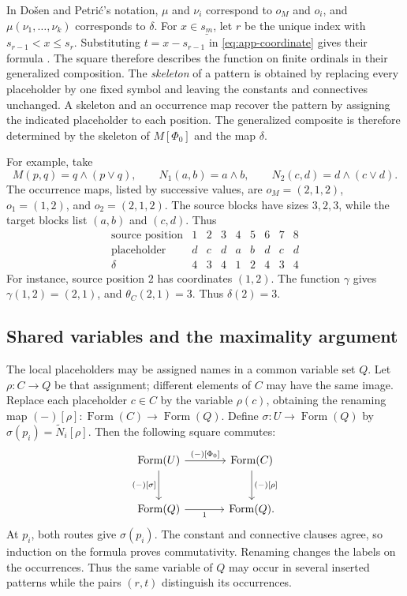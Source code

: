 \documentclass[11pt]{article}
\newcommand{\FormulaSet}{\operatorname{Form}}
\begin{document}
In Do\v{s}en and Petri\'c's notation, $\mu$ and $\nu_i$ correspond to
$o_M$ and $o_i$, and $\mu(\nu_1,\ldots,\nu_k)$ corresponds to $\delta$.
For $x\in\underline{s_m}$, let $r$ be the unique index with
$s_{r-1}<x\leq s_r$. Substituting $t=x-s_{r-1}$ in
\eqref{eq:app-coordinate} gives their formula
\cite[\S2.5, p.~46]{DP}. The square therefore describes the
function on finite ordinals in their generalized composition.
The \emph{skeleton} of a pattern is obtained by replacing every
placeholder by one fixed symbol and leaving the constants and
connectives unchanged. A skeleton and an occurrence map recover
the pattern by assigning the indicated placeholder to each position.
The generalized composite is therefore determined by the skeleton
of $M[\Phi_0]$ and the map $\delta$.

For example, take
\[
 M(p,q)=q\wedge(p\vee q),\qquad
 N_1(a,b)=a\wedge b,\qquad
 N_2(c,d)=d\wedge(c\vee d).
\]
The occurrence maps, listed by successive values, are
$o_M=(2,1,2)$, $o_1=(1,2)$, and $o_2=(2,1,2)$.
The source blocks have sizes $3,2,3$, while the target blocks list
$(a,b)$ and $(c,d)$. Thus
\[
\begin{array}{c|ccc|cc|ccc}
 \text{source position}&1&2&3&4&5&6&7&8\\\hline
 \text{placeholder}&d&c&d&a&b&d&c&d\\
 \delta&4&3&4&1&2&4&3&4
\end{array}
\]
For instance, source position $2$ has coordinates $(1,2)$.
The function $\gamma$ gives $\gamma(1,2)=(2,1)$, and
$\theta_C(2,1)=3$. Thus $\delta(2)=3$.

\subsection{Shared variables and the maximality argument}\label{app:shared}

The local placeholders may be assigned names in a common variable
set $Q$. Let $\rho:C\to Q$ be that assignment; different elements
of $C$ may have the same image. Replace each placeholder $c\in C$
by the variable $\rho(c)$, obtaining the renaming map
$(-)[\rho]:\FormulaSet(C)\to\FormulaSet(Q)$. Define
$\sigma:U\to\FormulaSet(Q)$ by
$\sigma(p_i)=\widetilde N_i[\rho]$.
Then the following square commutes:
\begin{equation}\label{eq:app-renaming}
\begin{tikzcd}[column sep=large,row sep=large]
 \FormulaSet(U)\arrow[r,"{(-)[\Phi_0]}"]
    \arrow[d,"{(-)[\sigma]}"']
   &\FormulaSet(C)\arrow[d,"{(-)[\rho]}"]\\
 \FormulaSet(Q)\arrow[r,"1"']&\FormulaSet(Q).
\end{tikzcd}
\end{equation}
At $p_i$, both routes give $\sigma(p_i)$. The constant and connective
clauses agree, so induction on the formula proves commutativity.
Renaming changes the labels on the occurrences. Thus the same variable
of $Q$ may occur in several inserted patterns while the pairs $(r,t)$
distinguish its occurrences.
\end{document}
